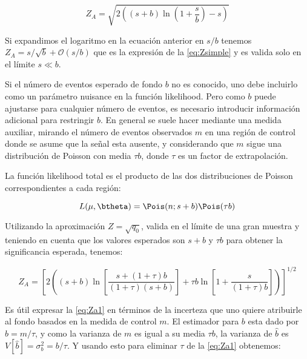 %

\begin{equation}
  Z_A = \sqrt{2\left( (s+b) \ln \left( 1 + \frac{s}{b}\right) - s \right)}
  \label{eq:Z}
\end{equation}

Si expandimos el logaritmo en la ecuación anterior en $s/b$ tenemos $Z_A =
s/\sqrt{b} + \mathcal{O}(s/b)$ que es la expresión de la {\eq}
\eqref{eq:Zsimple} y es valida solo en el límite $s \ll b$.

Si el número de eventos esperado de fondo $b$ no es conocido, uno debe incluirlo
como un parámetro nuisance en la función likelihood. Pero como $b$ puede
ajustarse para cualquier número de eventos, es necesario introducir información
adicional para restringir $b$. En general se suele hacer mediante una medida
auxiliar, mirando el número de eventos observados $m$ en una región de control
donde se asume que la señal esta ausente, y considerando que $m$ sigue
una distribución de Poisson con media $\tau b$, donde $\tau$ es un factor de
extrapolación.

La función likelihood total es el producto de las dos distribuciones de Poisson
correspondientes a cada región:

\begin{equation}
  L(\mu, \btheta) = \Pois (n;s+b) \Pois(\tau b)
\end{equation}

Utilizando la aproximación $Z = \sqrt{q_0}$, valida en el límite de una gran
muestra y teniendo en cuenta que los valores esperados son $s+b$ y $\tau b$ para
obtener la significancia esperada, tenemos:

\begin{equation}
  Z_A = \left[ 2 \left( (s+b) \ln \left[ \frac{s+(1+\tau)b}{(1+\tau)(s+b)}
      \right] + \tau b \ln \left[ 1 + \frac{s}{(1+\tau)b} \right] \right)
    \right]^{1/2}
  \label{eq:Za1}
\end{equation}

Es útil expresar la \cref{eq:Za1} en términos de la incerteza que uno
quiere atribuirle al fondo basados en la medida de control $m$. El estimador
para $b$ esta dado por $\hat{b} = m/\tau$, y como la varianza de $m$ es igual a
su media $\tau b$, la varianza de $\hat{b}$ es $V[\hat{b}] = \sigma_b^2 =
b/\tau$. Y usando esto para eliminar $\tau$ de la \cref{eq:Za1}
obtenemos:

